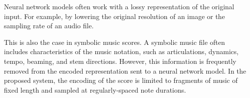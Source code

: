 
Neural network models often work with a lossy representation
of the original input. For example, by lowering the original
resolution of an image or the sampling rate of an audio
file.

This is also the case in symbolic music scores. A symbolic
music file often includes characteristics of the music
notation, such as articulations, dynamics, tempo, beaming,
and stem directions. However, this information is frequently
removed from the encoded representation sent to a neural
network model. In the proposed system, the encoding of the
score is limited to fragments of music of fixed length and
sampled at regularly-spaced note durations.
